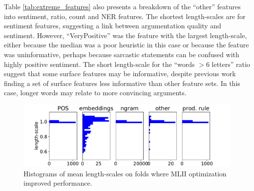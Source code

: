 Table \ref{tab:extreme_features} also presents a breakdown of the ``other'' features into sentiment, ratio, count and NER features. 
The shortest length-scales are for sentiment features, suggesting a link between 
argumentation quality and sentiment. However, ``VeryPositive'' was the feature with
the largest length-scale, either because the median was a poor heuristic in this case or
because the feature was uninformative, perhaps because sarcastic statements can be confused with highly positive sentiment.
The short length-scale for the ``words $>6$ letters'' ratio suggest that some surface features may be informative,
despite previous work \cite{wei2016post} finding a set of surface features less informative than other feature sets. 
In this case, longer words may relate to more convincing arguments. 
\begin{figure}[h]
\includegraphics[width=\columnwidth, clip=True, trim=32 0 57 0]{figures/features2/boxplot}
\caption{Histograms of mean length-scales on folds where MLII optimization improved performance.}
\label{fig:boxplot}
\end{figure}
